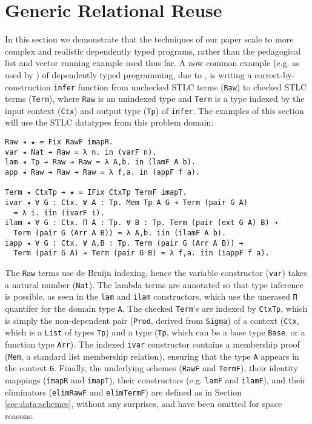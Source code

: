 \documentclass[acmsmall]{acmart}\settopmatter{}
\newcommand{\refsec}[1]{Section \ref{sec:#1}}
\newcommand{\labsec}[1]{\label{sec:#1}}
\begin{document}
\section{Generic Relational Reuse}
\labsec{rel}

In this section we demonstrate that the techniques of our paper scale
to more complex and realistic dependently typed programs, rather than
the pedagogical list and vector running example used thus far. A now
common example (e.g. as used by \citet{tutorial:agda}) of
dependently typed programming, due to \citet{viewfromleft}, is writing
a correct-by-construction \verb;infer; function from unchecked STLC
terms (\verb;Raw;) to checked STLC terms (\verb;Term;), where
\verb;Raw; is an unindexed type and \verb;Term; is a type indexed by
the input context (\verb;Ctx;) and output type (\verb;Tp;) of
\verb;infer;. The examples of this section will use the STLC datatypes
from this problem domain:
\begin{verbatim}
Raw ◂ ★ = Fix RawF imapR.
var ◂ Nat ➔ Raw = λ n. in (varF n).
lam ◂ Tp ➔ Raw ➔ Raw = λ A,b. in (lamF A b).
app ◂ Raw ➔ Raw ➔ Raw = λ f,a. in (appF f a).

Term ◂ CtxTp ➔ ★ = IFix CtxTp TermF imapT.
ivar ◂ ∀ G : Ctx. ∀ A : Tp. Mem Tp A G ➔ Term (pair G A)
  = λ i. iin (ivarF i).
ilam ◂ ∀ G : Ctx. Π A : Tp. ∀ B : Tp. Term (pair (ext G A) B) ➔
  Term (pair G (Arr A B)) = λ A,b. iin (ilamF A b).
iapp ◂ ∀ G : Ctx. ∀ A,B : Tp. Term (pair G (Arr A B)) ➔
  Term (pair G A) ➔ Term (pair G B) = λ f,a. iin (iappF f a).
\end{verbatim}
The \verb;Raw; terms use de Bruijn indexing, hence the variable
constructor (\verb;var;) takes a natural number (\verb;Nat;). The
lambda terms are annotated so that type inference is possible, as seen
in the \verb;lam; and \verb;ilam; constructors, which use the unerased
\verb;Π; quantifer for the domain type \verb;A;. The checked
\verb;Term;'s are indexed by \verb;CtxTp;, which is simply the
non-dependent pair (\verb;Prod;, derived from \verb;Sigma;) of a
context (\verb;Ctx;, which is a \verb;List; of types \verb;Tp;) and a
type (\verb;Tp;, which can be a base type \verb;Base;, or a function
type \verb;Arr;). The indexed \verb;ivar; constructor contains a
membership proof (\verb;Mem;, a standard list membership relation),
ensuring that the type \verb;A; appears in the context
\verb;G;. Finally, the underlying schemes (\verb;RawF; and
\verb;TermF;), their identity mappings (\verb;imapR; and
\verb;imapT;), their constructors (e.g. \verb;lamF; and \verb;ilamF;),
and their eliminators (\verb;elimRawF; and \verb;elimTermF;) are
defined as in \refsec{data:schemes}, without any surprises, and have
been omitted for space reasons.
\end{document}
